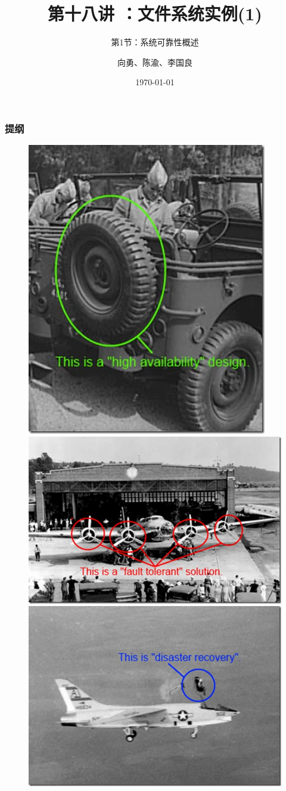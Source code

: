 


\title[第18讲]{第十八讲 ：文件系统实例(1)} %
\subtitle{第1节：系统可靠性概述}
\author{向勇、陈渝、李国良} %
\date{\today} %



\begin{frame}
\titlepage %
\end{frame}

\begin{frame}
\frametitle{提纲} %
\tableofcontents %

\begin{figure}
\includegraphics[width=0.2\linewidth]{figs/ha.jpg}
\includegraphics[width=0.37\linewidth]{figs/ft.jpg}
\includegraphics[width=0.34\linewidth]{figs/dr.jpg}
\end{figure}
\end{frame}
